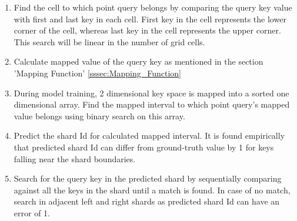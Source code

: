 \begin{enumerate}
	\item Find the cell to which point query belongs by comparing the query key value with first and last key in each cell. First key in the cell represents the lower corner of the cell, whereas last key in the cell represents the upper corner. This search will be linear in the number of grid cells.
	\item Calculate mapped value of the query key as mentioned in the section 'Mapping Function' \ref{sssec:Mapping_Function}
	\item During model training, 2 dimensional key space is mapped into a sorted one dimensional array. Find the mapped interval to which point query's mapped value belongs using binary search on this array.  
	\item Predict the shard Id for calculated mapped interval. It is found empirically that predicted shard Id can differ from ground-truth value by 1 for keys falling near the shard boundaries. 
	\item Search for the query key in the predicted shard by sequentially comparing against all the keys in the shard until a match is found. In case of no match, search in adjacent left and right shards as predicted shard Id can have an error of 1. 
\end{enumerate}
